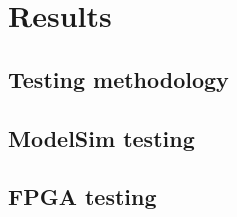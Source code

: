 \newpage
\chapter{Results}



\section{Testing methodology}


\section{ModelSim testing}


\section{FPGA testing}

